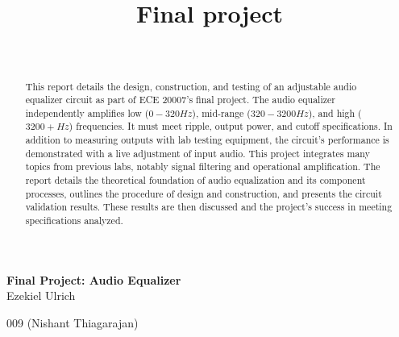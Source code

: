 \documentclass[notitlepage, 12pt]{report}
\title{Final project}
\begin{document}
\begin{center}
\Large \textbf{Final Project: Audio Equalizer} \\
\small 
Ezekiel Ulrich \\
\date\\
009 (Nishant Thiagarajan)\\
\end{center}
\vspace{4in}

\begin{abstract}
\noindent This report details the design, construction, and testing of an adjustable audio equalizer circuit as 
part of ECE 20007's final project. 
The audio equalizer independently amplifies low ($0-320 Hz$), 
mid-range ($320-3200 Hz$), and high ($3200+ Hz$) frequencies. It must meet ripple, output power, and cutoff specifications.
In addition to measuring outputs with lab testing equipment, the circuit's performance 
is demonstrated with a live adjustment of input audio.
This project integrates many topics from previous labs, 
notably signal filtering and operational amplification. The report 
details the theoretical foundation of audio equalization and its component 
processes, outlines the procedure of design and construction, and presents 
the circuit validation results. These results are then discussed and the 
project's success in meeting specifications analyzed.  
\end{abstract}

\newpage
\end{document}
